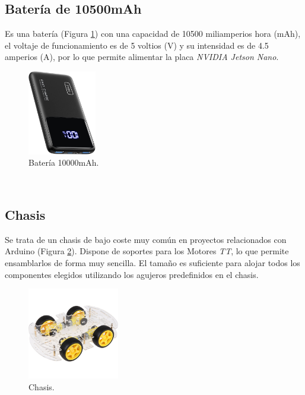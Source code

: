 \subsection{Batería de 10500mAh}
\label{subsection:battery}
Es una batería (Figura \ref{fig:battery}) con una capacidad de 10500 miliamperios hora (mAh), el voltaje de funcionamiento es de 5 voltios (V) y su intensidad es de 4.5 amperios (A), por lo que permite alimentar la placa \textit{NVIDIA Jetson Nano}.\\

\begin{figure} [h!]
	\begin{center}
		\includegraphics[width=3cm]{figs/battery2}
	\end{center}
	\caption{Batería 10000mAh.}
	\label{fig:battery}
\end{figure}\

\subsection{Chasis}
\label{subsection:chasis}
Se trata de un chasis de bajo coste muy común en proyectos relacionados con Arduino (Figura \ref{fig:chasis}). Dispone de soportes para los Motores \textit{TT}, lo que permite ensamblarlos de forma muy sencilla. El tamaño es suficiente para alojar todos los componentes elegidos utilizando los agujeros predefinidos en el chasis.\\

\begin{figure} [h!]
	\begin{center}
		\includegraphics[width=4cm]{figs/chasis}
	\end{center}
	\caption{Chasis.}
	\label{fig:chasis}
\end{figure}\


